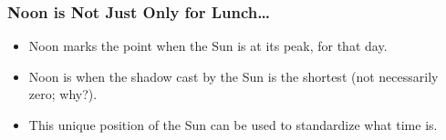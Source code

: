 \begin{frame}
\frametitle{Noon is Not Just Only for Lunch\ldots}

\begin{itemize}
\item Noon marks the point when the Sun is at its peak, for that day.
\item Noon is when the shadow cast by the Sun is the shortest (not necessarily zero; why?).
\item This unique position of the Sun can be used to standardize what time is.
\end{itemize}
\end{frame}

